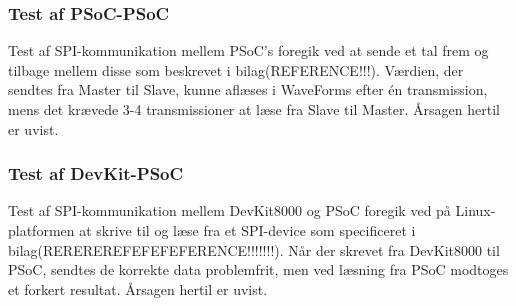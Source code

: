 \subsubsection{Test af PSoC-PSoC}
Test af SPI-kommunikation mellem PSoC's foregik ved at sende et tal frem og tilbage mellem disse som beskrevet i bilag(REFERENCE!!!). Værdien, der sendtes fra Master til Slave, kunne aflæses i WaveForms efter én transmission, mens det krævede 3-4 transmissioner at læse fra Slave til Master. Årsagen hertil er uvist.

\subsubsection{Test af DevKit-PSoC}
Test af SPI-kommunikation mellem DevKit8000 og PSoC foregik ved på Linux-platformen at skrive til og læse fra et SPI-device som specificeret i bilag(REREREREFEFEFEFERENCE!!!!!!!). Når der skrevet fra DevKit8000 til PSoC, sendtes de korrekte data problemfrit, men ved læsning fra PSoC modtoges et forkert resultat. Årsagen hertil er uvist.